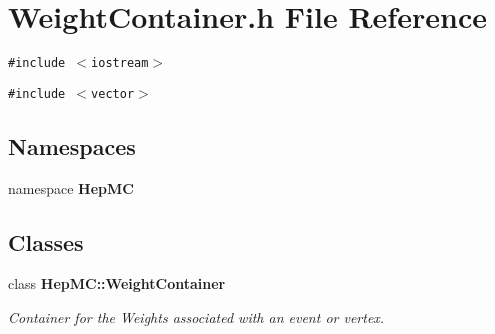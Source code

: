 \section{Weight\-Container.h File Reference}
\label{WeightContainer_8h}
{\tt \#include $<$iostream$>$}\par
{\tt \#include $<$vector$>$}\par
\subsection*{Namespaces}
\begin{CompactItemize}
\item 
namespace {\bf Hep\-MC}
\end{CompactItemize}
\subsection*{Classes}
\begin{CompactItemize}
\item 
class {\bf Hep\-MC::Weight\-Container}
\begin{CompactList}\small\item\em Container for the Weights associated with an event or vertex. \item\end{CompactList}\end{CompactItemize}
